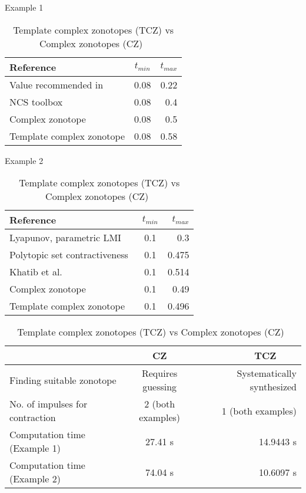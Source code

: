 \begin{table}
\begin{minipage}{0.49\textwidth}
\caption{Example 1}
\begin{tabular}{|l|c|r|}
  \hline
  Reference & $t_{min}$ & $t_{max}$ \\
\hline
Value recommended in~\cite{wittenmark2002computer} & 0.08 & 0.22\\
  \hline
  NCS toolbox~\cite{BauLoo_NECSYS12a} & 0.08 & 0.4 \\
  \hline
Complex zonotope~\cite{arvind2016lis} & 0.08 & 0.5 \\
\hline
  Template complex zonotope & 0.08 & 0.58 \\
  \hline
\end{tabular}
\label{tab:com1}
\end{minipage}
\begin{minipage}{0.49\textwidth}
\caption{Example 2}
\label{tab:com2}
\begin{tabular}{|l|c|r|}
\hline
    Reference & $t_{min}$ & $t_{max}$ \\
  \hline
  Lyapunov, parametric LMI~\cite{2013hetel} & 0.1 & 0.3 \\
  \hline
  Polytopic set contractiveness~\cite{2014-fiacchini-set} & 0.1 & 0.475 \\
  \hline
Khatib et al.~\cite{AlKhatib2015} & 0.1 & 0.514\\
\hline
Complex zonotope~\cite{arvind2016lis} & 0.1 & 0.49 \\
\hline
  Template complex zonotope & 0.1 & 0.496 \\
  \hline
\end{tabular}
\end{minipage}
\vspace{1em}
\caption{Template complex zonotopes (TCZ) vs
    Complex zonotopes (CZ)~\cite{arvind2016lis}}
\center
 \begin{tabular}{|l|c|r|}
  \hline
  $~$ & CZ & TCZ $~~~~~~~~$\\
  \hline
  Finding suitable zonotope & Requires guessing & Systematically synthesized\\
\hline
  No. of impulses for contraction & 2 (both examples) & 1 (both examples)\\
  \hline
    Computation time (Example 1) & 27.41 s & 14.9443 s \\
\hline
Computation time (Example 2) & 74.04 s & 10.6097 s\\
\hline
\end{tabular}
\label{tab:tcz-cz}
\end{table}

